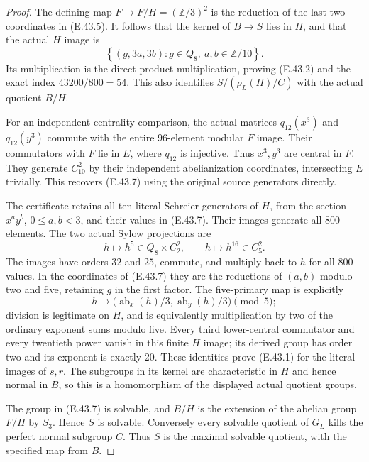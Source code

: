 \begin{proof}
The defining map $F\to F/H=(\mathbb Z/3)^2$
is the reduction of the last two coordinates
in \textup{(E.43.5)}.
It follows that the kernel of $B\to S$ lies
in $H$, and that the actual $H$ image is
\[
 \left\{(g,3a,3b):g\in Q_8,
                         \ a,b\in\mathbb Z/10\right\}.
 \tag{E.43.7}
\]
Its multiplication is the direct-product
multiplication, proving \textup{(E.43.2)}
and the exact index $43200/800=54$.
This also identifies $S/(\rho_L(H)/C)$ with
the actual quotient $B/H$.

For an independent centrality comparison,
the actual matrices $q_{12}(x^3)$ and
$q_{12}(y^3)$ commute with the entire
$96$-element modular $F$ image.
Their commutators with $\overline F$ lie in
$\overline E$, where $q_{12}$ is injective.
Thus $x^3,y^3$ are central in $\overline F$.
They generate $C_{10}^2$ by their independent
abelianization coordinates, intersecting
$\overline E$ trivially.  This recovers
\textup{(E.43.7)} using the original source
generators directly.

The certificate retains all ten literal
Schreier generators of $H$, from the section
$x^a y^b$, $0\le a,b<3$, and their values
in \textup{(E.43.7)}.
Their images generate all $800$ elements.
The two actual Sylow projections are
\[
 h\longmapsto h^5\in Q_8\times C_2^2,
 \qquad
 h\longmapsto h^{16}\in C_5^2.
 \tag{E.43.8}
\]
The images have orders $32$ and $25$, commute,
and multiply back to $h$ for all $800$ values.
In the coordinates of \textup{(E.43.7)}
they are the reductions of $(a,b)$ modulo
two and five, retaining $g$ in the first
factor.  The five-primary map is explicitly
\[
 h\longmapsto
 \bigl(\operatorname{ab}_x(h)/3,
       \operatorname{ab}_y(h)/3\bigr)\pmod5;
 \tag{E.43.9}
\]
division is legitimate on $H$, and is
equivalently multiplication by two of
the ordinary exponent sums modulo five.
Every third lower-central commutator and
every twentieth power vanish in this
finite $H$ image; its derived group has
order two and its exponent is exactly
$20$.  These identities prove
\textup{(E.43.1)} for the literal images
of $s,r$.  The subgroups in its kernel
are characteristic in $H$ and hence
normal in $B$, so this is a homomorphism
of the displayed actual quotient groups.

The group in \textup{(E.43.7)} is solvable,
and $B/H$ is the extension of the abelian
group $F/H$ by $S_3$.  Hence $S$ is
solvable.  Conversely every solvable
quotient of $G_L$ kills the perfect
normal subgroup $C$.  Thus $S$ is the
maximal solvable quotient, with the
specified map from $B$.


\end{proof}
